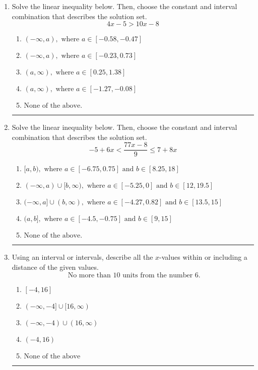 \documentclass[14pt]{extbook}
\newcommand{\litem}[1]{\item#1\hspace*{-1cm}\rule{\textwidth}{0.4pt}}
\begin{document}
\begin{enumerate}
{\begin{enumerate}[label=\Alph*.]
\end{enumerate} }
\litem{
Solve the linear inequality below. Then, choose the constant and interval combination that describes the solution set.\[ 4x -5 > 10x -8 \]\begin{enumerate}[label=\Alph*.]
\item \( (-\infty, a), \text{ where } a \in [-0.58, -0.47] \)
\item \( (-\infty, a), \text{ where } a \in [-0.23, 0.73] \)
\item \( (a, \infty), \text{ where } a \in [0.25, 1.38] \)
\item \( (a, \infty), \text{ where } a \in [-1.27, -0.08] \)
\item \( \text{None of the above}. \)

\end{enumerate} }
\litem{
Solve the linear inequality below. Then, choose the constant and interval combination that describes the solution set.\[ -5 + 6 x < \frac{77 x - 8}{9} \leq 7 + 8 x \]\begin{enumerate}[label=\Alph*.]
\item \( [a, b), \text{ where } a \in [-6.75, 0.75] \text{ and } b \in [8.25, 18] \)
\item \( (-\infty, a) \cup [b, \infty), \text{ where } a \in [-5.25, 0] \text{ and } b \in [12, 19.5] \)
\item \( (-\infty, a] \cup (b, \infty), \text{ where } a \in [-4.27, 0.82] \text{ and } b \in [13.5, 15] \)
\item \( (a, b], \text{ where } a \in [-4.5, -0.75] \text{ and } b \in [9, 15] \)
\item \( \text{None of the above.} \)

\end{enumerate} }
\litem{
Using an interval or intervals, describe all the $x$-values within or including a distance of the given values.\[ \text{ No more than } 10 \text{ units from the number } 6. \]\begin{enumerate}[label=\Alph*.]
\item \( [-4, 16] \)
\item \( (-\infty, -4] \cup [16, \infty) \)
\item \( (-\infty, -4) \cup (16, \infty) \)
\item \( (-4, 16) \)
\item \( \text{None of the above} \)


\end{enumerate}}
\end{enumerate}
\end{document}
